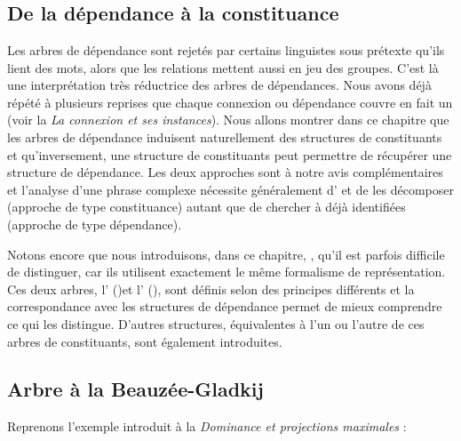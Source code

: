 \chapter{}\label{sec:3.4}

\section{De la dépendance à la constituance}\label{sec:3.4.0}

Les arbres de dépendance sont rejetés par certains linguistes sous prétexte qu’ils lient des mots, alors que les relations mettent aussi en jeu des groupes. C’est là une interprétation très réductrice des arbres de dépendances. Nous avons déjà répété à plusieurs reprises que chaque connexion ou dépendance couvre en fait un  (voir la  \textit{La connexion et ses instances}). Nous allons montrer dans ce chapitre que les arbres de dépendance induisent naturellement des structures de constituants et qu’inversement, une structure de constituants peut permettre de récupérer une structure de dépendance. Les deux approches sont à notre avis complémentaires et l’analyse d’une phrase complexe nécessite généralement d’ et de les décomposer (approche de type constituance) autant que de chercher à  déjà identifiées (approche de type dépendance).

Notons encore que nous introduisons, dans ce chapitre,  , qu’il est parfois difficile de distinguer, car ils utilisent exactement le même formalisme de représentation. Ces deux arbres, l’ ()\textstyleTermes{ }et l’ (), sont définis selon des principes différents et la correspondance avec les structures de dépendance permet de mieux comprendre ce qui les distingue. D’autres structures, équivalentes à l’un ou l’autre de ces arbres de constituants, sont également introduites.

\section{ Arbre à la Beauzée-Gladkij}\label{sec:3.4.1}

Reprenons l’exemple introduit à la  \textit{Dominance et projections maximales} :

